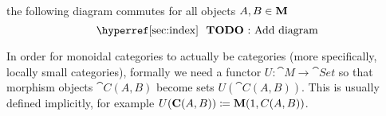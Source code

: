 \begin{definition}
\begin{thmenum}
    \item the following diagram commutes for all objects \( A, B \in \operatorname{\mathbf{M}} \)
    \begin{equation*}
      \text{\todo{Add diagram}}\iffalse\begin{mplibcode}
        u := 2cm;

        beginfig(1);
        input metapost/graphs;

        v1 := thelabel("$C(A, B)$", origin);
        v2 := thelabel("$C(B, B) \otimes C(A, B)$", (-2, 1) scaled u);
        v3 := thelabel("$1 \otimes C(A, B)$", (-2, -1) scaled u);
        v4 := thelabel("$C(A, B) \otimes C(A, A)$", (2, 1) scaled u);
        v5 := thelabel("$C(A, B) \otimes 1$", (2, -1) scaled u);

        a1 := straight_arc(v2, v1);
        a2 := straight_arc(v4, v1);
        a3 := straight_arc(v3, v1);
        a4 := straight_arc(v5, v1);
        a5 := straight_arc(v3, v2);
        a6 := straight_arc(v5, v4);

        draw_vertices(v);
        draw_arcs(a);

        label.urt("$\circ_{A, B, B}$", straight_arc_midpoint of a1);
        label.ulft("$\circ_{A, A, B}$", straight_arc_midpoint of a2);
        label.lrt("$\lambda$", straight_arc_midpoint of a3);
        label.llft("$\rho$", straight_arc_midpoint of a4);
        label.lft("$j_B \otimes \id_{C(A, B)}$", straight_arc_midpoint of a5);
        label.rt("$\id_{C(A, B)} \otimes j_A$", straight_arc_midpoint of a6);
        endfig;
      \end{mplibcode}\fi
    \end{equation*}
  \end{thmenum}

  In order for monoidal categories to actually be categories (more specifically, locally small categories), formally we need a functor \( U: \cat{M} \to \cat{Set} \) so that morphism objects \( \cat{C}(A, B) \) become sets \( U(\cat{C}(A, B)) \). This is usually defined implicitly, for example \( U(\operatorname{\mathbf{C}}(A, B)) \coloneqq \operatorname{\mathbf{M}}(1, C(A, B)) \).
\end{definition}
